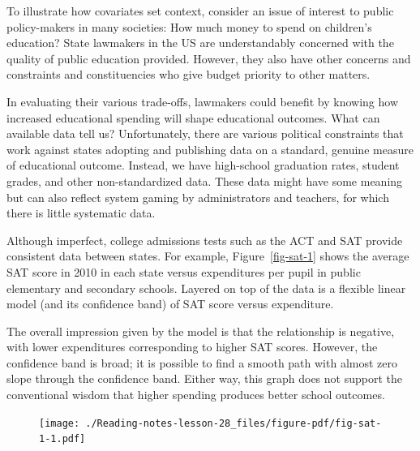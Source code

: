 \documentclass[
  letterpaper,
  DIV=11,
  numbers=noendperiod,
  oneside]{scrreprt}
\begin{document}
\begin{tcolorbox}[enhanced jigsaw, colbacktitle=quarto-callout-note-color!10!white, breakable, opacitybacktitle=0.6, colback=white, left=2mm, arc=.35mm, colframe=quarto-callout-note-color-frame, coltitle=black, toprule=.15mm, opacityback=0, leftrule=.75mm, bottomtitle=1mm, toptitle=1mm, titlerule=0mm, title=\textcolor{quarto-callout-note-color}{\faInfo}\hspace{0.5em}{Example: Spending and student performance}, rightrule=.15mm, bottomrule=.15mm]

To illustrate how covariates set context, consider an issue of interest
to public policy-makers in many societies: How much money to spend on
children's education? State lawmakers in the US are understandably
concerned with the quality of public education provided. However, they
also have other concerns and constraints and constituencies who give
budget priority to other matters.

In evaluating their various trade-offs, lawmakers could benefit by
knowing how increased educational spending will shape educational
outcomes. What can available data tell us? Unfortunately, there are
various political constraints that work against states adopting and
publishing data on a standard, genuine measure of educational outcome.
Instead, we have high-school graduation rates, student grades, and other
non-standardized data. These data might have some meaning but can also
reflect system gaming by administrators and teachers, for which there is
little systematic data.

Although imperfect, college admissions tests such as the ACT and SAT
provide consistent data between states. For example,
Figure~\ref{fig-sat-1} shows the average SAT score in 2010 in each state
versus expenditures per pupil in public elementary and secondary
schools. Layered on top of the data is a flexible linear model (and its
confidence band) of SAT score versus expenditure.

The overall impression given by the model is that the relationship is
negative, with lower expenditures corresponding to higher SAT scores.
However, the confidence band is broad; it is possible to find a smooth
path with almost zero slope through the confidence band. Either way,
this graph does not support the conventional wisdom that higher spending
produces better school outcomes.

\begin{figure}[H]

{\centering \texttt{[image: ./Reading-notes-lesson-28\_files/figure-pdf/fig-sat-1-1.pdf]}

}
\end{figure}
\end{tcolorbox}
\end{document}

